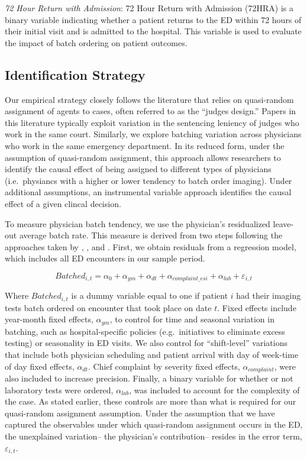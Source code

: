 \documentclass[,mnsc,nonblindrev]{informs}
\begin{document}
\textit{72 Hour Return with Admission}: 72 Hour Return with Admission
(72HRA) is a binary variable indicating whether a patient returns to the
ED within 72 hours of their initial visit and is admitted to the
hospital. This variable is used to evaluate the impact of batch ordering
on patient outcomes.

\hypertarget{identification-strategy}{%
\subsection{Identification Strategy}\label{identification-strategy}}

Our empirical strategy closely follows the literature that relies on
quasi-random assignment of agents to cases, often referred to as the
``judges design.'' Papers in this literature typically exploit variation
in the sentencing leniency of judges who work in the same court.
Similarly, we explore batching variation across physicians who work in
the same emergency department. In its reduced form, under the assumption
of quasi-random assignment, this approach allows researchers to identify
the causal effect of being assigned to different types of physicians
(i.e.~physiancs with a higher or lower tendency to batch order imaging).
Under additional assumptions, an instrumental variable approach
identifies the causal effect of a given clincal decision.

To measure physician batch tendency, we use the physician's residualized
leave-out average batch rate. This measure is derived from two steps
following the approaches taken by \citet{doyle2015measuring},
\citet{dobbie2018effects}, and \citet{eichmeyer2022pathways}. First, we
obtain residuals from a regression model, which includes all ED
encounters in our sample period.

\begin{equation}
Batched_{i,t} = \alpha_0 + \alpha_{ym} + \alpha_{dt} + \alpha_{complaint\_esi} + \alpha_{lab} + \varepsilon_{i,t}
\end{equation}

Where \(Batched_{i,t}\) is a dummy variable equal to one if patient
\(i\) had their imaging tests batch ordered on encounter that took place
on date \(t\). Fixed effects include year-month fixed effects,
\(\alpha_{ym}\), to control for time and seasonal variation in batching,
such as hospital-specific policies (e.g.~initiatives to eliminate excess
testing) or seasonality in ED visits. We also control for
``shift-level'' variations that include both physician scheduling and
patient arrival with day of week-time of day fixed effects,
\(\alpha_{dt}\). Chief complaint by severity fixed effects,
\(\alpha_{complaint}\), were also included to increase precision.
Finally, a binary variable for whether or not laboratory tests were
ordered, \(\alpha_{lab}\), was included to account for the complexity of
the case. As stated earlier, these controls are more than what is
required for our quasi-random assignment assumption. Under the
assumption that we have captured the observables under which
quasi-random assignment occurs in the ED, the unexplained variation--
the physician's contribution-- resides in the error term,
\(\varepsilon_{i,t}\).
\end{document}
